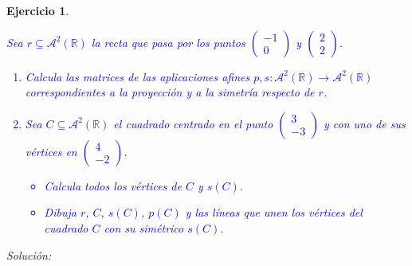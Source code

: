 \documentclass{amsart}
\newtheorem{ejer}{Ejercicio}
\begin{document}
\begin{ejer}
\textcolor{blue}{Sea $r \subseteq \mathcal{A}^2(\mathbb R)$ la recta que pasa por los puntos $\left( \begin{array}{r} -1  \\ 0 \end{array} \right)$ y $\left( \begin{array}{r} 2  \\ 2 \end{array} \right)$.
\begin{enumerate} 
\item[a)] Calcula las matrices de las aplicaciones afines $p,s:\mathcal{A}^2(\mathbb R) \to \mathcal{A}^2(\mathbb R)$ correspondientes a la {\sc proyección} y a la {\sc simetría} 
respecto de $r$. 
\item[b)] Sea $C \subseteq \mathcal{A}^2(\mathbb R)$ el cuadrado centrado en el punto $\left( \begin{array}{r} 3  \\ -3 \end{array} \right)$ y con uno de sus vértices
en $\left( \begin{array}{r} 4  \\ -2 \end{array} \right)$. 
\begin{itemize}
\item Calcula todos los vértices de $C$ y $s(C)$.
\item Dibuja $r$, $C$, $s(C)$, $p(C)$ y las líneas que unen los vértices del cuadrado $C$ con su simétrico $s(C)$.
\end{itemize}
\end{enumerate}}
\end{ejer}

{\it Solución:}

\end{document}
